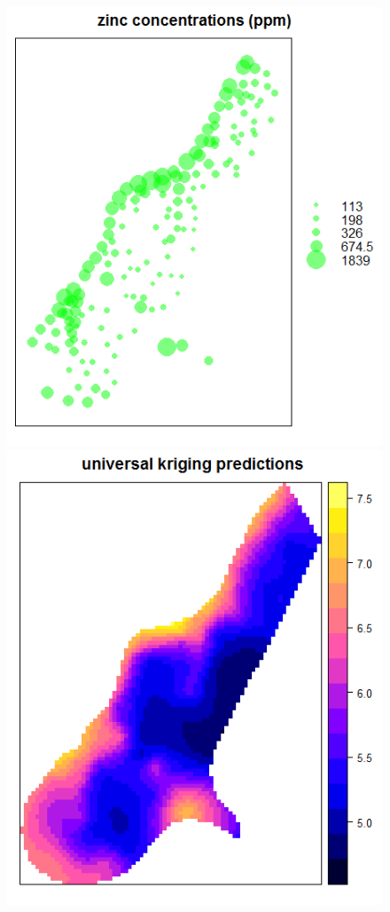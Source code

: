 \begin{figure}[!htb]
  \includegraphics[width=\linewidth]{EtatDeLArt/Kriging/ZincConcentrations.png}
\endminipage\hfill
{}
  \includegraphics[width=\linewidth]{EtatDeLArt/Kriging/UniversalPredictions.png}

\end{figure}
